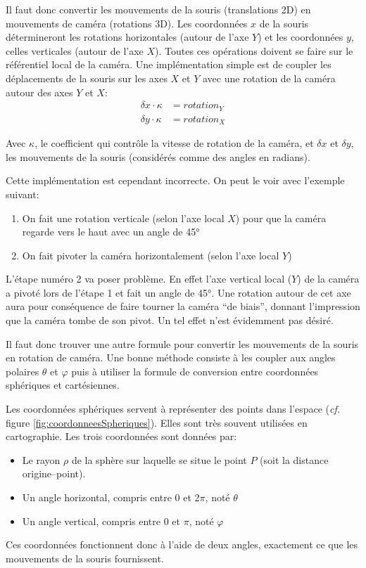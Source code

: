 Il faut donc convertir les mouvements de la souris (translations 2D) en mouvements de caméra (rotations 3D). Les coordonnées $x$ de la souris détermineront les rotations horizontales (autour de l'axe $Y$) et les coordonnées $y$, celles verticales (autour de l'axe $X$). Toutes ces opérations doivent se faire sur le référentiel local de la caméra. Une implémentation simple est de coupler les déplacements de la souris sur les axes $X$ et $Y$ avec une rotation de la caméra autour des axes $Y$ et $X$:
\begin{align*}
		\delta x \cdot \kappa &= rotation_Y\\
		\delta y \cdot \kappa &= rotation_X
\end{align*}

Avec $\kappa$, le coefficient qui contrôle la vitesse de rotation de la caméra, et $\delta x$ et $\delta y$, les mouvements de la souris (considérés comme des angles en radians).

Cette implémentation est cependant incorrecte. On peut le voir avec l'exemple suivant:
\begin{enumerate}
	\item On fait une rotation verticale (selon l'axe local $X$) pour que la caméra regarde vers le haut avec un angle de 45°
	\item On fait pivoter la caméra horizontalement (selon l'axe local $Y$)
\end{enumerate}

L'étape numéro 2 va poser problème. En effet l'axe vertical local ($Y$) de la caméra a pivoté lors de l'étape 1 et fait un angle de 45°. Une rotation autour de cet axe aura pour conséquence de faire tourner la caméra \enquote{de biais}, donnant l'impression que la caméra tombe de son pivot. Un tel effet n'est évidemment pas désiré.

Il faut donc trouver une autre formule pour convertir les mouvements de la souris en rotation de caméra. Une bonne méthode consiste à les coupler aux angles polaires $\theta$ et $\varphi$ puis à utiliser la formule de conversion entre coordonnées sphériques et cartésiennes\cite{Coordonneesspheriques_}.

Les coordonnées sphériques servent à représenter des points dans l'espace (\textit{cf.} figure \ref{fig:coordonneesSpheriques}). Elles sont très souvent utilisées en cartographie. Les trois coordonnées sont données par:
\begin{itemize}
	\item Le rayon $\rho$ de la sphère sur laquelle se situe le point $P$ (soit la distance origine--point).
	\item Un angle horizontal, compris entre 0 et 2$\pi$, noté $\theta$
	\item Un angle vertical, compris entre 0 et $\pi$, noté $\varphi$
\end{itemize}
Ces coordonnées fonctionnent donc à l'aide de deux angles, exactement ce que les mouvements de la souris fournissent.

